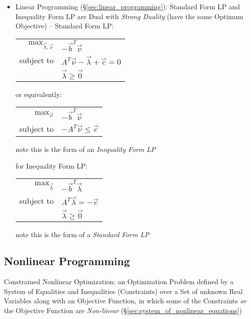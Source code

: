 \begin{itemize}
  \item Linear Programming (\S\ref{sec:linear_programming}): Standard Form LP
    and Inequality Form LP are Dual with \emph{Strong Duality} (have the same
    Optimum Objective) -- Standard Form LP:

    \begin{tabular}{r l}
      $\mathrm{max}_{\vec{\lambda},\vec{\nu}}$ &
        $-\vec{b}^T\vec{\nu}$ \\
      subject to & $A^T\vec{\nu} - \vec{\lambda} + \vec{c} = 0$ \\
                 & $\vec{\lambda} \geq \vec{0}$ \\
    \end{tabular}

    or equivalently:

    \begin{tabular}{r l}
      $\mathrm{max}_{\vec{\nu}}$ &
        $-\vec{b}^T\vec{\nu}$ \\
      subject to & $-A^T\vec{\nu} \leq \vec{c}$ \\
    \end{tabular}

    note this is the form of an \emph{Inequality Form LP}

    for Inequality Form LP:

    \begin{tabular}{r l}
      $\mathrm{max}_{\vec{\lambda}}$ & $-\vec{b}^T\vec{\lambda}$ \\
      subject to & $A^T\vec{\lambda} = -\vec{c}$ \\
                & $\vec{\lambda} \geq \vec{0}$  \\
    \end{tabular}

    note this is the form of a \emph{Standard Form LP}

\end{itemize}



\subsection{Nonlinear Programming}\label{sec:nonlinear_programming}

Constrained Nonlinear Optimization: an Optimization Problem defined by a System
of Equalities and Inequalities (Constraints) over a Set of unknown Real
Variables along with an Objective Function, in which some of the Constraints
\emph{or} the Objective Function are \emph{Non-linear}
(\S\ref{sec:system_of_nonlinear_equations})

